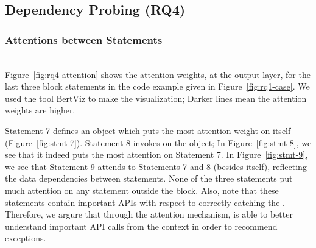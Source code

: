 \subsection{Dependency Probing (RQ4)}
\label{sec:rq4}


\subsubsection{Attentions between Statements}~\\
Figure~\ref{fig:rq4-attention} shows the attention weights, at the output layer, for the last three  block statements in the code example given in Figure~\ref{fig:rq1-case}. We used the tool BertViz to make the visualization; Darker lines mean the attention weights are higher. 

Statement 7 defines an  object which puts the most attention weight on itself (Figure~\ref{fig:stmt-7}). Statement 8 invokes  on the  object; In Figure~\ref{fig:stmt-8}, we see that it indeed puts the most attention on Statement 7. In Figure~\ref{fig:stmt-9}, we see that Statement 9 attends to Statements 7 and 8 (besides itself), reflecting the data dependencies between statements. None of the three statements put much attention on any statement outside the  block. Also, note that these statements contain important APIs with respect to correctly catching the . Therefore, we argure that through the attention mechanism, {\tool} is able to better understand important API calls from the context in order to recommend exceptions.

